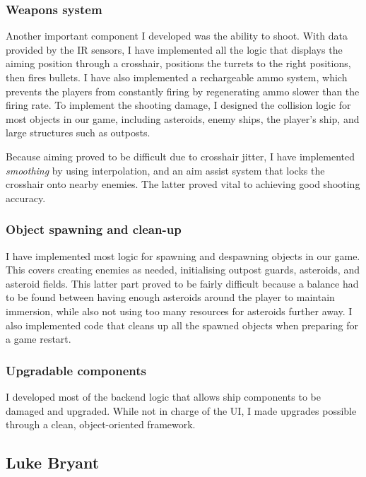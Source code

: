 \documentclass[a4paper,11pt]{article}
\begin{document}
\subsubsection{Weapons system}

Another important component I developed was the ability to shoot. With data provided by the IR sensors, I have implemented all the logic that displays the aiming position through a crosshair, positions the turrets to the right positions, then fires bullets. I have also implemented a rechargeable ammo system, which prevents the players from constantly firing by regenerating ammo slower than the firing rate. To implement the shooting damage, I designed the collision logic for most objects in our game, including asteroids, enemy ships, the player’s ship, and large structures such as outposts.

Because aiming proved to be difficult due to crosshair jitter, I have implemented \emph{smoothing} by using interpolation, and an aim assist system that locks the crosshair onto nearby enemies. The latter proved vital to achieving good shooting accuracy.

\subsubsection{Object spawning and clean-up}

I have implemented most logic for spawning and despawning objects in our game. This covers creating enemies as needed, initialising outpost guards, asteroids, and asteroid fields. This latter part proved to be fairly difficult because a balance had to be found between having enough asteroids around the player to maintain immersion, while also not using too many resources for asteroids further away. I also implemented code that cleans up all the spawned objects when preparing for a game restart.

\subsubsection{Upgradable components}

I developed most of the backend logic that allows ship components to be damaged and upgraded. While not in charge of the UI, I made upgrades possible through a clean, object-oriented framework.

\clearpage

\subsection{Luke Bryant}
\end{document}
